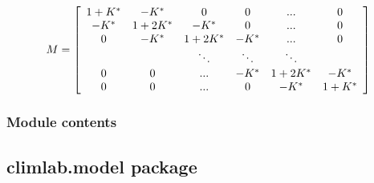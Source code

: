 \documentclass[letterpaper,10pt,english]{sphinxmanual}
\begin{document}
\begin{fulllineitems}
\begin{description}
\end{description}
\begin{gather}
\begin{split}M= \left[ \begin{array}{cccccc}
1+K^* & -K^* & 0 & 0 & ... & 0  \\
-K^* & 1+2K^* & -K^* & 0 & ... & 0 \\
0 & -K^* & 1+2K^* & -K^* &... & 0  \\
  &  & \ddots & \ddots & \ddots & \\
0 & 0 & ... & -K^* & 1+2K^* & -K^* \\
0 & 0 & ... & 0 & -K^* & 1+K^* \\
\end{array} \right]    \end{split}\notag
\end{gather}
\end{fulllineitems}


\begin{fulllineitems}
\label{api/climlab.dynamics:climlab.dynamics.diffusion._make_meridional_diffusion_matrix}
\end{fulllineitems}


\begin{fulllineitems}
\label{api/climlab.dynamics:climlab.dynamics.diffusion._solve_implicit_banded}
\end{fulllineitems}



\subsubsection{Module contents}
\label{api/climlab.dynamics:module-climlab.dynamics}\label{api/climlab.dynamics:module-contents}

\subsection{climlab.model package}
\label{api/climlab.model:climlab-model-package}\label{api/climlab.model::doc}
\end{document}
